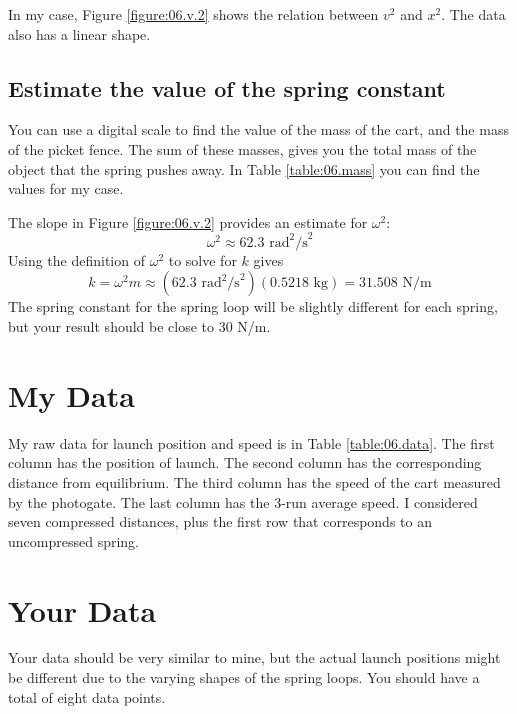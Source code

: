 In my case, Figure \ref{figure:06.v.2} shows the relation between $v^{2}$ and $x^{2}$. The data also has a linear shape.
\subsection{Estimate the value of the spring constant}
You can use a digital scale to find the value of the mass of the cart, and the mass of the picket fence. The sum of these masses, gives you the total mass of the object that the spring pushes away. In Table \ref{table:06.mass} you can find the values for my case.

The slope in Figure \ref{figure:06.v.2} provides an estimate for $\omega^{2}$:
\begin{equation}
    \omega^{2} \approx 62.3 \text{ rad}^{2}\text{/s}^{2}
\end{equation}
Using the definition of $\omega^{2}$ to solve for $k$ gives
\begin{equation}
    k = \omega^{2} m \approx \left( 62.3 \text{ rad}^{2}\text{/s}^{2} \right) \left( 0.5218 \text{ kg} \right) = 31.508 \text{ N/m}
\end{equation}
The spring constant for the spring loop will be slightly different for each spring, but your result should be close to 30 N/m.
\section{My Data}
My raw data for launch position and speed is in Table \ref{table:06.data}. The first column has the position of launch. The second column has the corresponding distance from equilibrium. The third column has the speed of the cart measured by the photogate. The last column has the 3-run average speed. I considered seven compressed distances, plus the first row that corresponds to an uncompressed spring.
\section{Your Data}
Your data should be very similar to mine, but the actual launch positions might be different due to the varying shapes of the spring loops. You should have a total of eight data points.
\newpage
